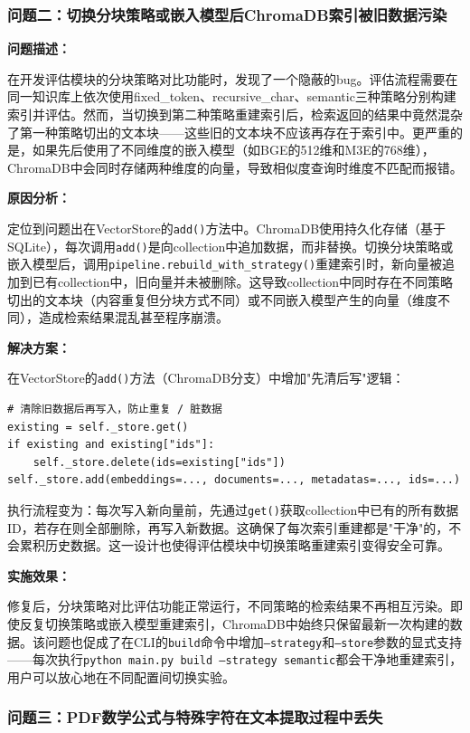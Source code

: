 \documentclass[10pt,a4paper]{article}
\begin{document}
\subsubsection{问题二：切换分块策略或嵌入模型后ChromaDB索引被旧数据污染}

\textbf{问题描述：}

在开发评估模块的分块策略对比功能时，发现了一个隐蔽的bug。评估流程需要在同一知识库上依次使用fixed\_token、recursive\_char、semantic三种策略分别构建索引并评估。然而，当切换到第二种策略重建索引后，检索返回的结果中竟然混杂了第一种策略切出的文本块——这些旧的文本块不应该再存在于索引中。更严重的是，如果先后使用了不同维度的嵌入模型（如BGE的512维和M3E的768维），ChromaDB中会同时存储两种维度的向量，导致相似度查询时维度不匹配而报错。

\textbf{原因分析：}

定位到问题出在VectorStore的\texttt{add()}方法中。ChromaDB使用持久化存储（基于SQLite），每次调用\texttt{add()}是向collection中追加数据，而非替换。切换分块策略或嵌入模型后，调用\texttt{pipeline.rebuild\_with\_strategy()}重建索引时，新向量被追加到已有collection中，旧向量并未被删除。这导致collection中同时存在不同策略切出的文本块（内容重复但分块方式不同）或不同嵌入模型产生的向量（维度不同），造成检索结果混乱甚至程序崩溃。

\textbf{解决方案：}

在VectorStore的\texttt{add()}方法（ChromaDB分支）中增加"先清后写"逻辑：

\begin{verbatim}
# 清除旧数据后再写入，防止重复 / 脏数据
existing = self._store.get()
if existing and existing["ids"]:
    self._store.delete(ids=existing["ids"])
self._store.add(embeddings=..., documents=..., metadatas=..., ids=...)
\end{verbatim}

执行流程变为：每次写入新向量前，先通过\texttt{get()}获取collection中已有的所有数据ID，若存在则全部删除，再写入新数据。这确保了每次索引重建都是"干净"的，不会累积历史数据。这一设计也使得评估模块中切换策略重建索引变得安全可靠。

\textbf{实施效果：}

修复后，分块策略对比评估功能正常运行，不同策略的检索结果不再相互污染。即使反复切换策略或嵌入模型重建索引，ChromaDB中始终只保留最新一次构建的数据。该问题也促成了在CLI的\texttt{build}命令中增加\texttt{--strategy}和\texttt{--store}参数的显式支持——每次执行\texttt{python main.py build --strategy semantic}都会干净地重建索引，用户可以放心地在不同配置间切换实验。

\subsubsection{问题三：PDF数学公式与特殊字符在文本提取过程中丢失}
\end{document}
